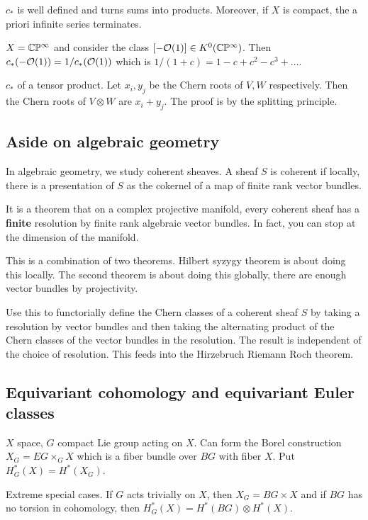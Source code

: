\documentclass[12pt]{article}
\begin{document}
\begin{proposition}
    $c_*$ is well defined and turns sums into products. Moreover, if $X$ is compact, the a priori infinite series terminates.
\end{proposition}

\begin{example}
    $X = \mathbb{C}\mathbb{P}^\infty$ and consider the class $[-{\mathcal{O}}(1)] \in K^0(\mathbb{C}\mathbb{P}^\infty)$. Then $c_*(-{\mathcal{O}}(1)) = 1/c_*({\mathcal{O}}(1))$ which is $1/(1+c) = 1 - c + c^2 - c^3 + \dots$.
\end{example}

$c_*$ of a tensor product. Let $x_i,y_j$ be the Chern roots of $V,W$ respectively. Then the Chern roots of $V\otimes W$ are $x_i + y_j$. The proof is by the splitting principle.    

\subsection{Aside on algebraic geometry}
In algebraic geometry, we study coherent sheaves. A sheaf $S$ is coherent if locally, there is a presentation of $S$ as the cokernel of a map of finite rank vector bundles. 

It is a theorem that on a complex projective manifold, every coherent sheaf has a \textbf{finite} resolution by finite rank algebraic vector bundles. In fact, you can stop at the dimension of the manifold.

This is a combination of two theorems. Hilbert syzygy theorem is about doing this locally. The second theorem is about doing this globally, there are enough vector bundles by projectivity.

Use this to functorially define the Chern classes of a coherent sheaf $S$ by taking a resolution by vector bundles and then taking the alternating product of the Chern classes of the vector bundles in the resolution. The result is independent of the choice of resolution. This feeds into the Hirzebruch Riemann Roch theorem.

\subsection{Equivariant cohomology and equivariant Euler classes}
$X$ space, $G$ compact Lie group acting on $X$. Can form the Borel construction $X_G = EG \times_G X$ which is a fiber bundle over $BG$ with fiber $X$. Put $H^*_G(X) = H^*(X_G)$. 

Extreme special cases.
If $G$ acts trivially on $X$, then $X_G = BG \times X$ and if $BG$ has no torsion in cohomology, then $H^*_G(X) = H^*(BG) \otimes H^*(X)$.
\end{document}

